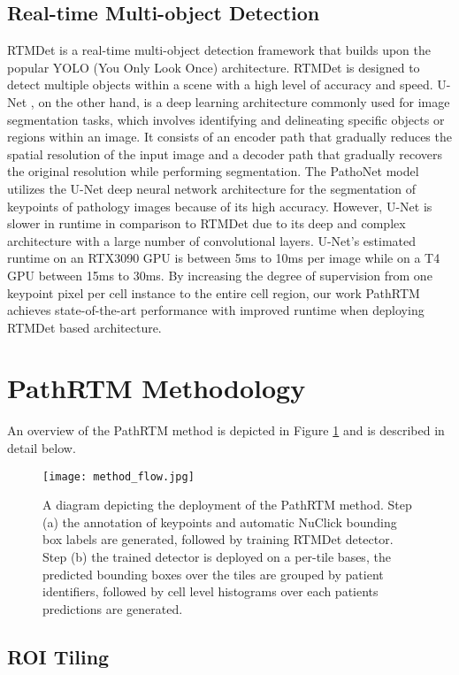 \documentclass[runningheads]{llncs}
\begin{document}
\subsection{Real-time Multi-object Detection}
RTMDet is a real-time multi-object detection framework that builds upon the popular YOLO (You Only Look Once) architecture. RTMDet is designed to detect multiple objects within a scene with a high level of accuracy and speed. U-Net \cite{DBLP:journals/corr/RonnebergerFB15}, on the other hand, is a deep learning architecture commonly used for image segmentation tasks, which involves identifying and delineating specific objects or regions within an image. It consists of an encoder path that gradually reduces the spatial resolution of the input image and a decoder path that gradually recovers the original resolution while performing segmentation. The PathoNet model utilizes the U-Net deep neural network architecture for the segmentation of keypoints of pathology images because of its high accuracy. However, U-Net is slower in runtime in comparison to RTMDet due to its deep and complex architecture with a large number of convolutional layers.  U-Net's estimated runtime on an RTX3090 GPU is between 5ms to 10ms per image  while on a T4 GPU between 15ms to 30ms. By increasing the degree of supervision from one keypoint pixel per cell instance to the entire cell region, our work PathRTM achieves state-of-the-art performance with improved runtime when deploying RTMDet based architecture. 

\section{PathRTM Methodology}

An overview of the PathRTM method is depicted in Figure \ref{flow} and is described in detail below.

\begin{figure}
	\centering
	\texttt{[image: method\_flow.jpg]}
	\caption{A diagram depicting the deployment of the PathRTM method. Step (a) the annotation of keypoints and automatic NuClick bounding box labels are generated, followed by training RTMDet detector. Step (b) the trained detector is deployed on a per-tile bases, the predicted bounding boxes over the tiles are grouped by patient identifiers, followed by cell level histograms over each patients predictions are generated. } \label{flow}
\end{figure}

\subsection{ROI Tiling}
\end{document}
